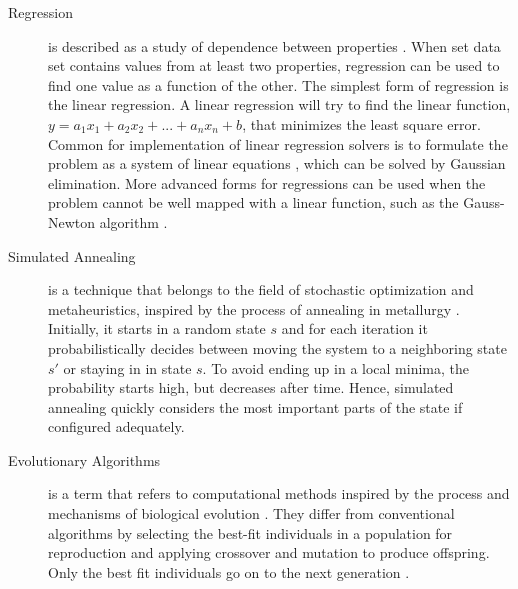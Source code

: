 \begin{description}
    \item[Regression] is described as a study of dependence between properties
        \cite{weisberg2005applied}. When set data set contains values from at
        least two properties, regression can be used to find one value as a
        function of the other. The simplest form of regression is the linear
        regression. A linear regression will try to find the linear function,
        $y=a_1x_1+a_2x_2+...+a_nx_n+b$, that minimizes the least square error.
        Common for implementation of linear regression solvers is to formulate
        the problem as a system of linear equations \cite{lay2011linear}, which
        can be solved by Gaussian elimination. More advanced forms for
        regressions can be used when the problem cannot be well mapped with a
        linear function, such as the Gauss-Newton algorithm
        \cite{myers1990classical}.

    \item[Simulated Annealing] is a technique that belongs to the field of
        stochastic optimization and metaheuristics, inspired by the process of
        annealing in metallurgy \cite{van1987simulated}. Initially, it starts in
        a random state $s$ and for each iteration it probabilistically decides
        between moving the system to a neighboring state $s'$ or staying in in
        state $s$. To avoid ending up in a local minima, the probability starts
        high, but decreases after time. Hence, simulated annealing quickly
        considers the most important parts of the state if configured adequately.

    \item[Evolutionary Algorithms] is a term that refers to computational
        methods inspired by the process and mechanisms of biological evolution
        \cite{fogel1997evolutionary}.  They differ from conventional algorithms
        by selecting the best-fit individuals in a population for reproduction
        and applying crossover and mutation to produce offspring. Only the best
        fit individuals go on to the next generation \cite{introtoga}.

\end{description}

